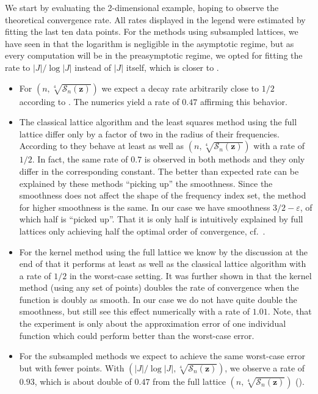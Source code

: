 \documentclass[a4paper]{amsart}
\begin{document}
We start by evaluating the 2-dimensional example, hoping to observe the theoretical convergence rate.
All rates displayed in the legend were estimated by fitting the last ten data points.
For the methods using subsampled lattices, we have seen in  that the logarithm is negligible in the asymptotic regime, but as every computation will be in the preasymptotic regime, we opted for fitting the rate to $|J|/\log|J|$ instead of $|J|$ itself, which is closer to .
\begin{itemize}
\item[\scalebox{1.2}{$\bullet$:}]
    For $(n, \sqrt[4]{\mathcal S_n(\bm z)})$ we expect a decay rate arbitrarily close to $1/2$ according to .
    The numerics yield a rate of $0.47$ affirming this behavior.

\item[{\color{green}$\blacktriangledown$},{\color{blue}\scalebox{0.7}{\rotatebox{45}{$\blacksquare$}}}:]
    The classical lattice algorithm and the least squares method using the full lattice differ only by a factor of two in the radius of their frequencies.
    According to  they behave at least as well as $(n, \sqrt[4]{\mathcal S_n(\bm z)})$ with a rate of $1/2$.
    In fact, the same rate of $0.7$ is observed in both methods and they only differ in the corresponding constant.
    The better than expected rate can be explained by these methods ``picking up'' the smoothness.
    Since the smoothness does not affect the shape of the frequency index set, the method for higher smoothness is the same.
    In our case we have smoothness $3/2-\varepsilon$, of which half is ``picked up''.
    That it is only half is intuitively explained by full lattices only achieving half the optimal order of convergence, cf.\ \cite{BKUV17}.

\item[{\color{orange}$\blacktriangle$}:]
    For the kernel method using the full lattice we know by the discussion at the end of  that it performs at least as well as the classical lattice algorithm with a rate of $1/2$ in the worst-case setting.
    It was further shown in \cite{SK25} that the kernel method (using any set of points) doubles the rate of convergence when the function is doubly as smooth.
    In our case we do not have quite double the smoothness, but still see this effect numerically with a rate of $1.01$.
    Note, that the experiment is only about the approximation error of one individual function which could perform better than the worst-case error.
\item[\scalebox{1.2}{$\circ$:}]
    For the subsampled methods we expect to achieve the same worst-case error but with fewer points.
    With $(|J|/\log |J|, \sqrt[4]{\mathcal S_n(\bm z)})$, we observe a rate of $0.93$, which is about double of $0.47$ from the full lattice $(n,\sqrt[4]{\mathcal S_n(\bm z)})$ (\scalebox{1.2}{$\bullet$}).


\end{itemize}
\end{document}

